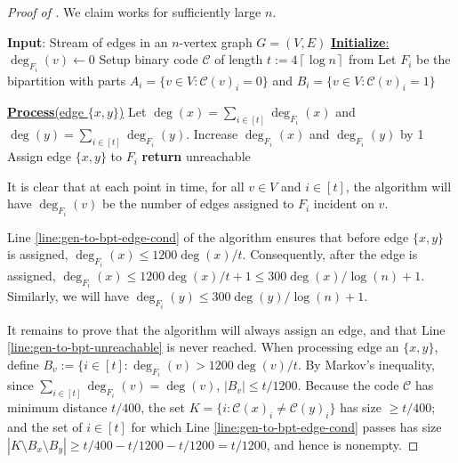 \documentclass[10pt]{article}
\theoremstyle{definition}\newtheorem{definition}[lemma]{Definition}
\theoremstyle{remark}  \newtheorem*{remark}{Remark}
\newcommand{\cC}{\mathcal{C}}
\newcommand{\ceil}[1]{{\left\lceil{#1}\right\rceil}}
\begin{document}
\begin{proof}[Proof of ]
  We claim  works for sufficiently large $n$.
    
  \begin{algorithm}[htb!]
    \caption{Algorithm to partition general graph edges into bipartite graphs\label{alg:gen-to-bpt}}
    \begin{algorithmic}[1]
    \Statex \textbf{Input}: Stream of edges in an $n$-vertex graph $G=(V,E)$
      \Statex
      \Statex \underline{\textbf{Initialize}:}
        \State $\deg_{F_i}(v) \gets 0$
      \EndFor
      \State Setup binary code $\cC$ of length $t := 4 \ceil{\log n}$ from 
        \State Let $F_i$ be the bipartition with parts $A_i = \{v \in V : \cC(v)_i = 0 \}$ and $B_i = \{v \in V : \cC(v)_i = 1 \}$
      \EndFor

    \Statex 
    \Statex\underline{\textbf{Process}(edge $\{x,y\}$)}
      \State Let $\deg(x) = \sum_{i \in [t]} \deg_{F_i}(x)$ and $\deg(y) = \sum_{i \in [t]} \deg_{F_i}(y)$.
          \If{$\cC(x)_i \ne \cC(y)_i$ and $\deg_{F_i}(x) \le 1200 \deg(x) / t$ and $\deg_{F_i}(y) \le 1200 \deg(y) / t$}\label{line:gen-to-bpt-edge-cond}
              \State Increase $\deg_{F_i}(x)$ and $\deg_{F_i}(y)$ by 1
              \State Assign edge $\{x,y\}$ to $F_i$
              \State \textbf{return}
          \EndIf
      \EndFor
      \State unreachable \label{line:gen-to-bpt-unreachable}
    \end{algorithmic}
  \end{algorithm}

  It is clear that at each point in time, for all $v \in V$ and $i \in [t]$, the algorithm will have $\deg_{F_i}(v)$ be the number of edges assigned to $F_i$ incident on $v$.
  
  Line \ref{line:gen-to-bpt-edge-cond} of the algorithm ensures that before
  edge $\{x,y\}$ is assigned, $\deg_{F_i}(x) \le 1200 \deg(x) / t$. Consequently, after the edge is assigned, $\deg_{F_i}(x) \le 1200 \deg(x) / t + 1 \le 300 \deg(x) / \log(n) + 1$. Similarly, we will have $\deg_{F_i}(y) \le 300 \deg(y) / \log(n) + 1$.
  
  It remains to prove that the algorithm will always assign an edge, and that Line \ref{line:gen-to-bpt-unreachable} is never reached. When processing edge an $\{x,y\}$,
  define $B_v := \{i \in [t]: \deg_{F_i}(v) > 1200 \deg(v) / t$. By Markov's inequality,
  since $\sum_{i\in[t]} \deg_{F_i}(v) = \deg(v)$, $|B_v| \le t / 1200$. Because the code
  $\cC$ has minimum distance $t / 400$, the set $K = \{i : \cC(x)_i \ne \cC(y)_i\}$ has size $\ge t/400$; and the set of $i \in [t]$ for which Line \ref{line:gen-to-bpt-edge-cond} passes has size $|K \setminus B_x \setminus B_y| \ge t/400 - t/1200 - t/1200 = t/1200$,
  and hence is nonempty.
\end{proof}
\end{document}
